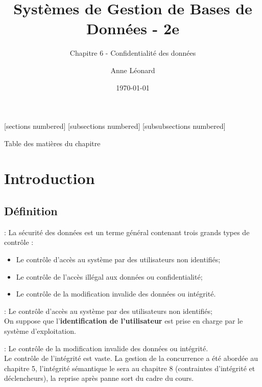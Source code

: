 \documentclass[10pt]{beamer}
\title{Systèmes de Gestion de Bases de Données - 2e}
\subtitle{Chapitre 6 - Confidentialité des données}
\date{\today}
\author{Anne Léonard}
\institute{Haute École de la Province de Liège}
\begin{document}
\maketitle

[sections numbered]
[subsections numbered]
[subsubsections numbered]
\begin{frame}[allowframebreaks]{Table des matières du chapitre}
    \tableofcontents[subsectionstyle=show/show/hide,subsubsectionstyle=show/show/hide,]
\end{frame}

\section{Introduction}
\tocss
\subsection{Définition}
\begin{frame}{\secname : \subsecname}
    La sécurité des données est un terme général contenant trois grands types de contrôle :
    \begin{itemize}
        \item Le contrôle d'accès au système par des utilisateurs non identifiés;
        \item Le contrôle de l'accès illégal aux données ou confidentialité;
        \item Le contrôle de la modification invalide des données ou intégrité.
    \end{itemize}
\end{frame}

\begin{frame}{\secname : \subsecname}
    Le contrôle d'accès au système par des utilisateurs non identifiés;\\
    On suppose que l'\textbf{identification de l'utilisateur} est prise en charge par le système d'exploitation.
\end{frame}

\begin{frame}{\secname : \subsecname}
    Le contrôle de la modification invalide des données ou intégrité.\\
    Le contrôle de l'intégrité est vaste. La gestion de la concurrence a été abordée au chapitre 5, l'intégrité sémantique le sera au chapitre 8 (contraintes d'intégrité et déclencheurs), la reprise après panne sort du cadre du cours.
\end{frame}
\end{document}
